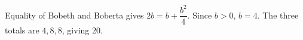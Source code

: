 Equality of Bobeth and Boberta gives $2b=b+\dfrac{b^2}{4}$. Since $b>0$, $b=4$. The three totals are $4,8,8$, giving $\boxed{20}$.
